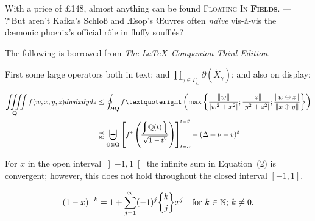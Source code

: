 \documentclass[11pt]{article}
\begin{document}
With a price of \pounds 148, almost anything can be found \textsc{Floating In \textbf{Fields}.} --- ?`But aren't Kafka's
Schlo{\ss} and {\AE}sop's {\OE}uvres often \emph{na{\"\i}ve} vis-\`{a}-vis
the d{\ae}monic ph{\oe}nix's official r\^{o}le in fluffy souffl\'{e}s?

\newcommand\ibinom[2]{\genfrac\lbrace\rbrace{0pt}{}{#1}{#2}}
The following is borrowed from \emph{The \LaTeX\ Companion Third Edition}.

First some large operators both in text:
 and
    $ \prod_{\gamma\in\Gamma_{\widetilde{C}}}
               \partial(\widetilde{X}_\gamma) $; and also on display:

\begin{equation} \begin{split} \iiiint\limits_{\mathbf{Q}} f(w,x,y,z)dwdxdydz
      & \leq \oint_{\bm{\partial Q}} f’ \left( \max \left\lbrace
              \frac{\lVert w \rVert}{\lvert w^2 + x^2 \rvert} ;
              \frac{\lVert z \rVert}{\lvert y^2 + z^2 \rvert} ;
              \frac{\lVert w \oplus z \rVert}{\lVert x \oplus y \rVert}
                                        \right\rbrace \right)          \\
 & \precapprox \biguplus_{\mathbb{Q} \Subset \bar{\mathbf{Q}}}
              \left[ f^{\ast} \left(
                \frac{\left\lmoustache\mathbb{Q}(t)\right\rmoustache}
                     {\sqrt {1 - t^2}}
              \right) \right]_{t=\alpha}^{t=\vartheta} - ( \Delta + \nu - v )^3
    \end{split}  \end{equation}

For $x$ in the open interval $ \left] -1, 1 \right[ $ the infinite
    sum in Equation~(2) is convergent; however, this does
    not hold throughout the closed interval $ \left[ -1, 1 \right] $.

 \begin{equation}
  (1 - x)^{-k} = 1 + \sum_{j=1}^{\infty} (-1)^j \ibinom{k}{j} x^j
      \text{\quad for $k \in \mathbb{N}$; $k \neq 0$.}  %
    \end{equation}

\end{document}
